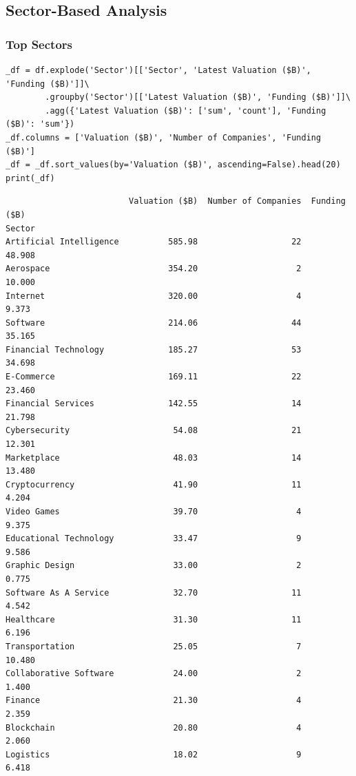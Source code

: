 \documentclass[a4paper,12pt]{article}
\begin{document}
\subsection{Sector-Based Analysis}
\label{sec:orga013647}
\subsubsection{Top Sectors}
\label{sec:orgf472206}
\begin{verbatim}
_df = df.explode('Sector')[['Sector', 'Latest Valuation ($B)', 'Funding ($B)']]\
        .groupby('Sector')[['Latest Valuation ($B)', 'Funding ($B)']]\
        .agg({'Latest Valuation ($B)': ['sum', 'count'], 'Funding ($B)': 'sum'})
_df.columns = ['Valuation ($B)', 'Number of Companies', 'Funding ($B)']
_df = _df.sort_values(by='Valuation ($B)', ascending=False).head(20)
print(_df)
\end{verbatim}

\label{}
\begin{verbatim}
                         Valuation ($B)  Number of Companies  Funding ($B)
Sector
Artificial Intelligence          585.98                   22        48.908
Aerospace                        354.20                    2        10.000
Internet                         320.00                    4         9.373
Software                         214.06                   44        35.165
Financial Technology             185.27                   53        34.698
E-Commerce                       169.11                   22        23.460
Financial Services               142.55                   14        21.798
Cybersecurity                     54.08                   21        12.301
Marketplace                       48.03                   14        13.480
Cryptocurrency                    41.90                   11         4.204
Video Games                       39.70                    4         9.375
Educational Technology            33.47                    9         9.586
Graphic Design                    33.00                    2         0.775
Software As A Service             32.70                   11         4.542
Healthcare                        31.30                   11         6.196
Transportation                    25.05                    7        10.480
Collaborative Software            24.00                    2         1.400
Finance                           21.30                    4         2.359
Blockchain                        20.80                    4         2.060
Logistics                         18.02                    9         6.418
\end{verbatim}
\end{document}

